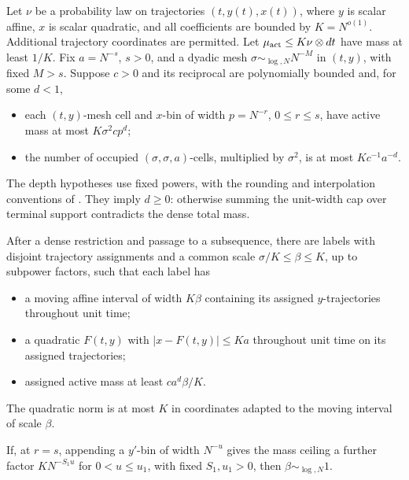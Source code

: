 \begin{theorem}\label{thm:scalar-mesh-projection}
Let \(\nu\) be a probability law on trajectories
\((t,y(t),x(t))\), where \(y\) is scalar affine, \(x\) is
scalar quadratic, and all coefficients are bounded by \(K=N^{o(1)}\).
Additional trajectory coordinates are permitted.  Let
\(\mu_{\rm act}\le K\nu\otimes dt\) have mass at least \(1/K\).
Fix \(a=N^{-s}\), \(s>0\), and a dyadic mesh
\(\sigma\sim_{\log,N}N^{-M}\) in \((t,y)\), with fixed \(M>s\).
Suppose \(c>0\) and its reciprocal are polynomially bounded and,
for some \(d<1\),
\begin{itemize}
\item each \((t,y)\)-mesh cell and \(x\)-bin of width
\(p=N^{-r}\), \(0\le r\le s\), have active mass at most
\(K\sigma^2cp^d\);
\item the number of occupied \((\sigma,\sigma,a)\)-cells,
multiplied by \(\sigma^2\), is at most \(Kc^{-1}a^{-d}\).
\end{itemize}
The depth hypotheses use fixed powers, with the rounding and
interpolation conventions of .  They imply
\(d\ge0\): otherwise summing the unit-width cap over terminal
support contradicts the dense total mass.

After a dense restriction and passage to a subsequence, there are
labels with disjoint trajectory assignments and a common scale
\(\sigma/K\le\beta\le K\), up to subpower factors, such that
each label has
\begin{itemize}
\item a moving affine interval of width \(K\beta\) containing
its assigned \(y\)-trajectories throughout unit time;
\item a quadratic \(F(t,y)\) with \(|x-F(t,y)|\le Ka\)
throughout unit time on its assigned trajectories;
\item assigned active mass at least \(ca^d\beta/K\).
\end{itemize}
The quadratic norm is at most \(K\) in coordinates adapted to the
moving interval of scale \(\beta\).

If, at \(r=s\), appending a \(y'\)-bin of width \(N^{-u}\)
gives the mass ceiling a further factor \(KN^{-S_1u}\) for
\(0<u\le u_1\), with fixed \(S_1,u_1>0\), then
\(\beta\sim_{\log,N}1\).

\end{theorem}
